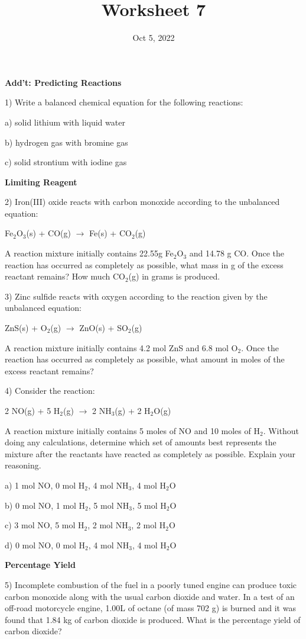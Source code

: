 \documentclass[12pt]{article}
\title{\textbf{Worksheet 7}}
\date{Oct 5, 2022}
\begin{document}
\maketitle 

\textbf{Add't: Predicting Reactions}

1) Write a balanced chemical equation for the following reactions:

a) solid lithium with liquid water

b) hydrogen gas with bromine gas

c) solid strontium with iodine gas

\textbf{Limiting Reagent}

2) Iron(III) oxide reacts with carbon monoxide according to the unbalanced
equation:

Fe$_2$O$_3$(s) + CO(g) $\rightarrow$ Fe(s) + CO$_2$(g)

A reaction mixture initially contains 22.55g Fe$_2$O$_3$ and 14.78 g CO.
Once the reaction has occurred as completely as possible, what mass in g of
the excess reactant remains? How much CO$_2$(g) in grams is produced.

3) Zinc sulfide reacts with oxygen according to the reaction given by the
unbalanced equation:

ZnS(s) + O$_2$(g) $\rightarrow$ ZnO(s) + SO$_2$(g)

A reaction mixture initially contains 4.2 mol ZnS and 6.8 mol O$_2$. Once
the reaction has occurred as completely as possible, what amount in moles
of the excess reactant remains?

4) Consider the reaction:

2 NO(g) + 5 H$_2$(g) $\rightarrow$ 2 NH$_3$(g) + 2 H$_2$O(g)

A reaction mixture initially contains 5 moles of NO and 10 moles
of H$_2$. Without doing any calculations, determine which set of
amounts best represents the mixture after the reactants have
reacted as completely as possible. Explain your reasoning.

a) 1 mol NO, 0 mol H$_2$, 4 mol NH$_3$, 4 mol H$_2$O

b) 0 mol NO, 1 mol H$_2$, 5 mol NH$_3$, 5 mol H$_2$O

c) 3 mol NO, 5 mol H$_2$, 2 mol NH$_3$, 2 mol H$_2$O

d) 0 mol NO, 0 mol H$_2$, 4 mol NH$_3$, 4 mol H$_2$O

\newpage

\textbf{Percentage Yield}

5) Incomplete combustion of the fuel in a poorly tuned engine can produce
toxic carbon monoxide along with the usual carbon dioxide and water. In a
test of an off-road motorcycle engine, 1.00L of octane (of mass 702 g) is
burned and it was found that 1.84 kg of carbon dioxide is produced.
What is the percentage yield of carbon dioxide?
\end{document}
